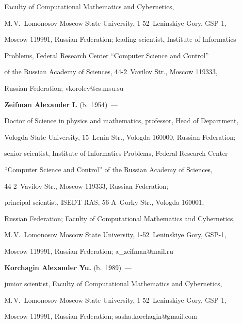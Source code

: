 Faculty of Computational Mathematics and Cybernetics, 


M.\,V.~Lomonosov Moscow State University, 1-52~Leninskiye Gory, GSP-1, 


Moscow 119991, Russian Federation; leading scientist, Institute of Informatics 


Problems, Federal Research Center ``Computer Science and Control'' 


of the Russian Academy of Sciences, 44-2~Vavilov Str., Moscow 119333,  


Russian Federation; \mbox{vkorolev@cs.msu.su} 





\vspace*{3pt} 





\noindent


\textbf{Zeifman Alexander I.} (b.\ 1954)~---


Doctor of Science in physics and mathematics, professor, Head of Department, 


Vologda State University, 15~Lenin Str., Vologda 160000, Russian Federation; 


senior scientist, Institute of Informatics Problems, Federal Research Center 


``Computer Science and Control'' of the Russian Academy of Sciences, 


44-2~Vavilov Str., Moscow 119333, Russian Federation; 


principal scientist, ISEDT RAS, 56-A~Gorky Str., Vologda 160001, 


Russian Federation; Faculty of Computational Mathematics and Cybernetics, 


M.\,V.~Lomonosov Moscow State University, 1-52~Leninskiye Gory, GSP-1, 


Moscow 119991, Russian Federation; \mbox{a\_zeifman@mail.ru}





 \vspace*{3pt}


 


 \noindent


 \textbf{Korchagin Alexander Yu.} (b.\ 1989)~---


 junior scientist, Faculty of Computational Mathematics and Cybernetics, 


 M.\,V.~Lomonosov Moscow State University, 1-52~Leninskiye Gory, GSP-1, 


 Moscow 119991, Russian Federation; \mbox{sasha.korchagin@gmail.com}


\label{end\stat}








\renewcommand{\bibname}{\protect\rm Литература} 



